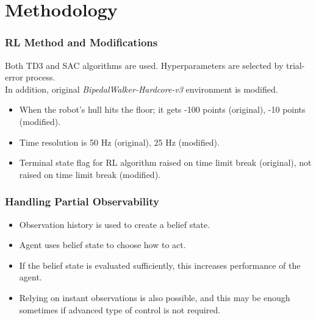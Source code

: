 \documentclass{beamer}
\begin{document}

\section{Methodology}

\begin{frame}
\frametitle{RL Method and Modifications}
Both TD3 and SAC algorithms are used. Hyperparameters are selected by trial-error process. \\
In addition, original \textit{BipedalWalker-Hardcore-v3} environment is modified.\\
\begin{itemize}
	\item When the robot's hull hits the floor; it gets -100 points (original), -10 points (modified). 
	\item Time resolution is 50 Hz (original), 25 Hz (modified).
	\item Terminal state flag for RL algorithm raised on time limit break (original), not raised on time limit break (modified). 
\end{itemize}
\end{frame}

\begin{frame}
\frametitle{Handling Partial Observability}
\begin{itemize}
	\item Observation history is used to create a belief state. 
	\item Agent uses belief state to choose how to act. 
	\item If the belief state is evaluated sufficiently, this increases performance of the agent. 
	\item Relying on instant observations is also possible, and this may be enough sometimes if advanced type of control is not required.
\end{itemize}
\end{frame}
\end{document}
